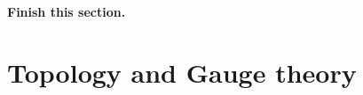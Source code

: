 \documentclass[reprint,prb,superscriptaddress]{revtex4-1}
\begin{document}
\textbf{Finish this section.}


 \section{Topology and Gauge theory}




%
%
\end{document}

